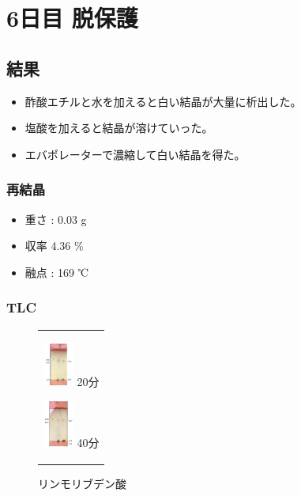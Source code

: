 \documentclass[a4paper,papersize,dvipdfmx]{jsarticle}
\begin{document}
\section*{6日目 脱保護}
\subsection*{結果}
\begin{itemize}
\item 酢酸エチルと水を加えると白い結晶が大量に析出した。
\item 塩酸を加えると結晶が溶けていった。
\item エバポレーターで濃縮して白い結晶を得た。

\end{itemize}
\subsubsection*{再結晶}
\begin{itemize}
\item 重さ : 0.03 g
\item 収率 4.36 \%
\item 融点 : 169 ℃

\end{itemize}
\subsubsection*{TLC}
\begin{figure}[htbp]
\begin{center}
\begin{tabular}{c}

\begin{minipage}{0.19\hsize}
\begin{center}
\includegraphics[clip, width=1.0cm]{imgs6/tlc-e20.PNG}
\hspace{1.6cm} 20分
\end{center}
\end{minipage}

\begin{minipage}{0.19\hsize}
\begin{center}
\includegraphics[clip, width=1.0cm]{imgs6/tlc-e40.PNG}
\hspace{1.6cm} 40分
\end{center}
\end{minipage}

\end{tabular}
\caption{リンモリブデン酸}
\end{center}
\end{figure}
\end{document}
